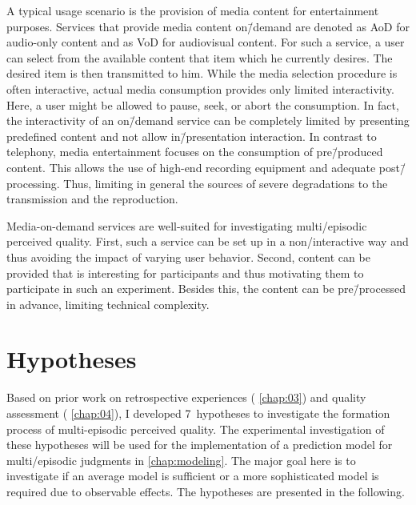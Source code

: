 A typical usage scenario is the provision of media content for entertainment purposes.
Services that provide media content on\=/demand are denoted as \acf{AoD} for audio-only content and as \acf{VoD} for audiovisual content.
For such a service, a user can select from the available content that item which he currently desires.
The desired item is then transmitted to him.
While the media selection procedure is often interactive, actual media consumption provides only limited interactivity.
Here, a user might be allowed to pause, seek, or abort the consumption.
In fact, the interactivity of an on\=/demand service can be completely limited by presenting predefined content and not allow in\=/presentation interaction.
In contrast to telephony, media entertainment focuses on the consumption of pre\=/produced content.
This allows the use of high-end recording equipment and adequate post\=/processing.
Thus, limiting in general the sources of severe degradations to the transmission and the reproduction.

Media-on-demand services are well-suited for investigating multi\-/episodic perceived quality.
First, such a service can be set up in a non\-/interactive way and thus avoiding the impact of varying user behavior.
Second, content can be provided that is interesting for participants and thus motivating them to participate in such an experiment.
Besides this, the content can be pre\=/processed in advance, limiting technical complexity.

\section{Hypotheses}
Based on prior work on retrospective experiences (\cf{} \autoref{chap:03}) and quality assessment (\cf{} \autoref{chap:04}), I developed 7~hypotheses to investigate the formation process of multi-episodic perceived quality.
The experimental investigation of these hypotheses will be used for the implementation of a prediction model for multi\-/episodic judgments in \autoref{chap:modeling}.
The major goal here is to investigate if an average model is sufficient or a more sophisticated model is required due to observable effects.
The hypotheses are presented in the following.

